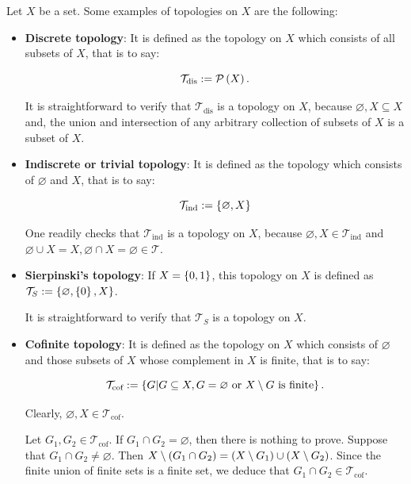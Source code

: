\begin{example}
  Let $X$ be a set. Some examples of topologies on $X$ are the following:
  
  \begin{itemize}
      \item \textbf{Discrete topology}: It is defined as the topology on $X$ which consists of all subsets of $X$, that is to say:

      \begin{equation}
          \mathcal{T}_{\text{dis}}:=\mathcal{P}\left(X\right).
      \end{equation}

      It is straightforward to verify that $\mathcal{T}_{\text{dis}}$ is a topology on $X$, because $\varnothing,X\subseteq X$ and, the union and intersection of any arbitrary collection of subsets of $X$ is a subset of $X$.
      \item \textbf{Indiscrete or trivial topology}: It is defined as the topology which consists of $\varnothing$ and $X$, that is to say:
      
      \begin{equation}
          \mathcal{T}_{\text{ind}}:=\left\{\varnothing,X\right\}
      \end{equation}

      One readily checks that $\mathcal{T}_{\text{ind}}$ is a topology on $X$, because $\varnothing,X\in\mathcal{T}_{\text{ind}}$ and $\varnothing\cup X=X,\varnothing\cap X=\varnothing\in\mathcal{T}$.
      \item \textbf{Sierpinski's topology}: If $X=\left\{0,1\right\}$, this topology on $X$ is defined as $\mathcal{T}_{S}:=\left\{\varnothing,\left\{0\right\},X\right\}$.
      
      It is straightforward to verify that $\mathcal{T}_{S}$ is a topology on $X$.
      \item \textbf{Cofinite topology}: It is defined as the topology on $X$ which consists of $\varnothing$ and those subsets of $X$ whose complement in $X$ is finite, that is to say:

      \begin{equation}
          \mathcal{T}_{\text{cof}}:=\left\{G\middle|G\subseteq X, G=\varnothing\text{ or }X\setminus G\text{ is finite}\right\}.
      \end{equation}

      Clearly, $\varnothing,X\in\mathcal{T}_{\text{cof}}$. 
      
      Let $G_1,G_2\in\mathcal{T}_{\text{cof}}$. If $G_1\cap G_2=\varnothing$, then there is nothing to prove. Suppose that $G_1\cap G_2\neq\varnothing$. Then $X\setminus\left(G_1\cap G_2\right)=\left(X\setminus G_1\right)\cup\left(X\setminus G_2\right)$. Since the finite union of finite sets is a finite set, we deduce that $G_1\cap G_2\in\mathcal{T}_{\text{cof}}$. 
      

\end{itemize}
\end{example}
